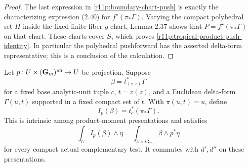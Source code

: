 \begin{proof}
The last expression in \eqref{r11p:boundary-chart-push} is exactly
the characterizing expression (2.40) for
$f^\star(\pi_*\Gamma)$.  Varying the compact polyhedral set $H$
inside the fixed finite-fiber $g$-chart, Lemma 2.37 shows that
$P=f^\star(\pi_*\Gamma)$ on that chart.  These charts cover $S$,
which proves \eqref{r11p:tropical-product-push-identity}.
In particular the polyhedral pushforward has the asserted
delta-form representative; this is a conclusion of the calculation.
\end{proof}

\begin{lemma}
\label{r11p:product-integration}
Let $p:U\times(\mathbf G_m)^{\rm an}\to U$ be projection.  Suppose
\[
                   \beta=t_{(c,z)}^*\Gamma
\]
for a fixed base analytic-unit tuple $c$, $t=v(z)$, and a Euclidean
delta-form $\Gamma(u,t)$ supported in a fixed compact set of $t$.
With $\pi(u,t)=u$, define
\[
                       I_p(\beta)=t_c^*(\pi_*\Gamma).
\tag{MT6}\label{r11p:product-definition}
\]
This is intrinsic among product-moment presentations and satisfies
\[
             \int_UI_p(\beta)\wedge\eta
                    =\int_{U\times\mathbf G_m}\beta\wedge p^*\eta
\tag{MT7}\label{r11p:product-pairing}
\]
for every compact actual complementary test.  It commutes with
$d',d''$ on these presentations.
\end{lemma}

